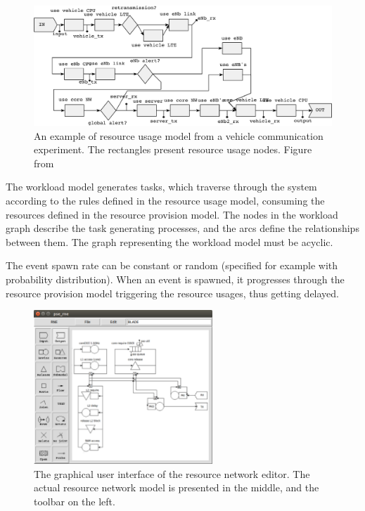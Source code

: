 \begin{figure}[]
  \begin{center}
    \includegraphics[width=\textwidth]{images/pse-models/pse-tg-example.pdf}
    \caption{An example of resource usage model from a vehicle communication experiment. The rectangles present resource usage nodes. Figure from~\cite{Hanhirova:2014:PSE}}
    \label{fig:resource-usage-model}
  \end{center}
\end{figure}

The workload model generates tasks, which traverse through the system according to the rules defined in the resource usage model, consuming the resources defined in the resource provision model. The nodes in the workload graph describe the task generating processes, and the arcs define the relationships between them. The graph representing the workload model must be acyclic.

The event spawn rate can be constant or random (specified for example with probability distribution). When an event is spawned, it progresses through the resource provision model triggering the resource usages, thus getting delayed.

\begin{figure}[]
  \begin{center}
    \includegraphics[width=0.6\textwidth]{images/rne-example.pdf}
    \caption{The graphical user interface of the resource network editor. The actual resource network model is presented in the middle, and the toolbar on the left.}
    \label{fig:rne-example}
  \end{center}
\end{figure}

